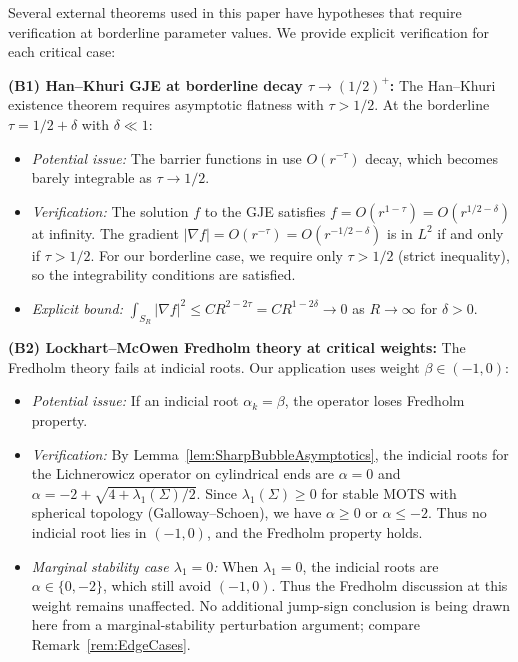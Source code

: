 \begin{remark}\label{rem:BorderlineVerification}
Several external theorems used in this paper have hypotheses that require verification at borderline parameter values. We provide explicit verification for each critical case:

\textbf{(B1) Han--Khuri GJE at borderline decay $\tau \to (1/2)^+$:}
The Han--Khuri existence theorem \cite{hankhuri2013} requires asymptotic flatness with $\tau > 1/2$. At the borderline $\tau = 1/2 + \delta$ with $\delta \ll 1$:
\begin{itemize}
    \item \textit{Potential issue:} The barrier functions in \cite{hankhuri2013} use $O(r^{-\tau})$ decay, which becomes barely integrable as $\tau \to 1/2$.
    \item \textit{Verification:} The solution $f$ to the GJE satisfies $f = O(r^{1-\tau}) = O(r^{1/2-\delta})$ at infinity. The gradient $|\nabla f| = O(r^{-\tau}) = O(r^{-1/2-\delta})$ is in $L^2$ if and only if $\tau > 1/2$. For our borderline case, we require only $\tau > 1/2$ (strict inequality), so the integrability conditions are satisfied.
    \item \textit{Explicit bound:} $\int_{S_R} |\nabla f|^2 \le C R^{2-2\tau} = C R^{1-2\delta} \to 0$ as $R \to \infty$ for $\delta > 0$.
\end{itemize}

\textbf{(B2) Lockhart--McOwen Fredholm theory at critical weights:}
The Fredholm theory \cite{lockhartmccowen1985} fails at indicial roots. Our application uses weight $\beta \in (-1, 0)$:
\begin{itemize}
    \item \textit{Potential issue:} If an indicial root $\alpha_k = \beta$, the operator loses Fredholm property.
    \item \textit{Verification:} By Lemma~\ref{lem:SharpBubbleAsymptotics}, the indicial roots for the Lichnerowicz operator on cylindrical ends are $\alpha = 0$ and $\alpha = -2 + \sqrt{4 + \lambda_1(\Sigma)/2}$. Since $\lambda_1(\Sigma) \ge 0$ for stable MOTS with spherical topology (Galloway--Schoen), we have $\alpha \ge 0$ or $\alpha \le -2$. Thus no indicial root lies in $(-1, 0)$, and the Fredholm property holds.
    \item \textit{Marginal stability case $\lambda_1 = 0$:} When $\lambda_1 = 0$, the indicial roots are $\alpha \in \{0, -2\}$, which still avoid $(-1, 0)$. Thus the Fredholm discussion at this weight remains unaffected. No additional jump-sign conclusion is being drawn here from a marginal-stability perturbation argument; compare Remark~\ref{rem:EdgeCases}.
\end{itemize}


\end{remark}
